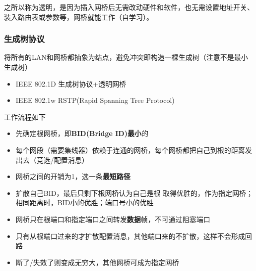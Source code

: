 之所以称为透明，是因为插入网桥后无需改动硬件和软件，也无需设置地址开关、装入路由表或参数等，网桥就能工作（自学习）。

\subsubsection{生成树协议}
将所有的LAN和网桥都抽象为结点，避免冲突即构造一棵生成树（注意不是最小生成树）
\begin{itemize}
\item IEEE 802.1D 生成树协议+透明网桥
\item IEEE 802.1w RSTP(Rapid Spanning Tree Protocol)
\end{itemize}

工作流程如下
\begin{itemize}
\item 先确定根网桥，即\textbf{BID(Bridge ID)最小}的
\item 每个网段（需要集线器）依赖于连通的网桥，每个网桥都把自己到根的距离发出去（竞选/配置消息）
\item 网桥之间的开销为1，选一条\textbf{最短路径}
\item 扩散自己BID，最后只剩下根网桥认为自己是根
取得优胜的，作为指定网桥；相同距离时，BID小的优胜；端口号小的优胜
\item 网桥只在根端口和指定端口之间转发\textbf{数据}帧，不可通过阻塞端口
\item 只有从根端口过来的才扩散配置消息，其他端口来的不扩散，这样不会形成回路
\item 断了/失效了则变成无穷大，其他网桥可成为指定网桥
\end{itemize}

